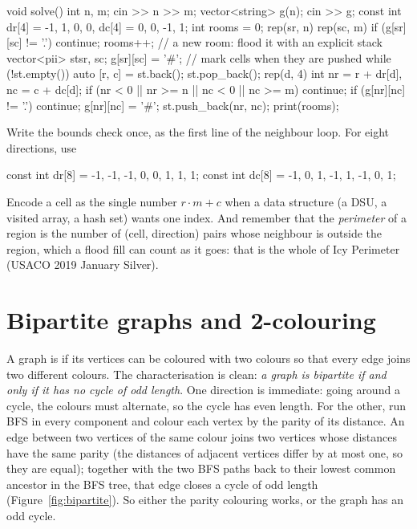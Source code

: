 \begin{code}
void solve() {
    int n, m;
    cin >> n >> m;
    vector<string> g(n);
    cin >> g;
    const int dr[4] = {-1, 1, 0, 0}, dc[4] = {0, 0, -1, 1};
    int rooms = 0;
    rep(sr, n) rep(sc, m) {
        if (g[sr][sc] != '.') continue;
        rooms++;  // a new room: flood it with an explicit stack
        vector<pii> st{{sr, sc}};
        g[sr][sc] = '#';  // mark cells when they are pushed
        while (!st.empty()) {
            auto [r, c] = st.back();
            st.pop_back();
            rep(d, 4) {
                int nr = r + dr[d], nc = c + dc[d];
                if (nr < 0 || nr >= n || nc < 0 || nc >= m) continue;
                if (g[nr][nc] != '.') continue;
                g[nr][nc] = '#';
                st.push_back({nr, nc});
            }
        }
    }
    print(rooms);
}
\end{code}


\begin{tip}
Write the bounds check once, as the first line of the neighbour loop. For eight directions, use
\begin{code}
const int dr[8] = {-1, -1, -1, 0, 0, 1, 1, 1};
const int dc[8] = {-1, 0, 1, -1, 1, -1, 0, 1};
\end{code}
Encode a cell as the single number
$r \cdot m + c$ when a data structure (a DSU, a visited array, a hash set) wants one index. And remember that the
\emph{perimeter} of a region is the number of (cell, direction) pairs whose neighbour is outside the region, which a flood
fill can count as it goes: that is the whole of Icy Perimeter (USACO 2019 January Silver).
\end{tip}

\section[Bipartite graphs]{Bipartite graphs and 2-colouring \hfill \silver}\label{sec:bipartite}

A graph is  if its vertices can be coloured with two colours so that every edge joins two different colours.
The characterisation is clean: \emph{a graph is bipartite if and only if it has no cycle of odd length}. One direction is
immediate: going around a cycle, the colours must alternate, so the cycle has even length. For the other, run BFS in every
component and colour each vertex by the parity of its distance. An edge between two vertices of the same colour joins two
vertices whose distances have the same parity (the distances of adjacent vertices differ by at most one, so they are equal);
together with the two BFS paths back to their lowest common ancestor in the BFS tree, that edge closes a cycle of odd length
(Figure~\ref{fig:bipartite}). So either the parity colouring works, or the graph has an odd cycle.

